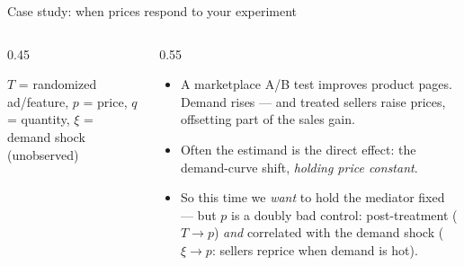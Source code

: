 \documentclass[aspectratio=169,11pt]{beamer}
\begin{document}
\begin{frame}{Case study: when prices respond to your experiment}
\begin{columns}
\begin{column}{0.45\textwidth}
\begin{center}
\end{center}
\smallskip
{\small $T$ = randomized ad/feature, $p$ = price, $q$ = quantity, $\xi$ = demand shock (unobserved)}
\end{column}
\begin{column}{0.55\textwidth}
\begin{itemize}
	\item A marketplace A/B test improves product pages. Demand rises --- and
	\alert{treated sellers raise prices}, offsetting part of the sales gain.

	\item Often the estimand is the \alert{direct effect}: the demand-curve shift,
	\emph{holding price constant}.

	\item So this time we \emph{want} to hold the mediator fixed --- but $p$ is a
	\alert{doubly bad control}: post-treatment ($T \rightarrow p$) \emph{and}
	correlated with the demand shock ($\xi \rightarrow p$: sellers reprice when
	demand is hot).
\end{itemize}
\end{column}
\end{columns}
\end{frame}
\end{document}
